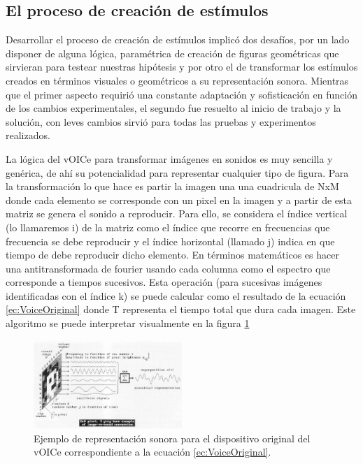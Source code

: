 \documentclass{article}
\begin{document}
\subsection{El proceso de creación de estímulos}
    
    Desarrollar el proceso de creación de estímulos implicó dos desafíos, por un lado disponer de alguna lógica, paramétrica de creación de figuras geométricas que sirvieran para testear nuestras hipótesis y por otro el de transformar los estímulos creados en términos visuales o geométricos a su representación sonora. Mientras que el primer aspecto requirió una constante adaptación y sofisticación en función de los cambios experimentales, el segundo fue resuelto al inicio de trabajo y la solución, con leves cambios sirvió para todas las pruebas y experimentos realizados. 
    
    La lógica del vOICe para transformar imágenes en sonidos es muy sencilla y genérica, de ahí su potencialidad para representar cualquier tipo de figura. Para la transformación lo que hace es partir la imagen una una cuadricula de NxM donde cada elemento se corresponde con un pixel en la imagen y a partir de esta matriz se genera el sonido a reproducir. Para ello, se considera el índice vertical (lo llamaremos i) de la matriz como el índice que recorre en frecuencias que frecuencia se debe reproducir y el índice horizontal (llamado j) indica en que tiempo de debe reproducir dicho elemento. En términos matemáticos es hacer una antitransformada de fourier usando cada columna como el espectro que corresponde a tiempos sucesivos. Esta operación (para sucesivas imágenes identificadas con el índice k) se puede calcular como el resultado de la ecuación \ref{ec:VoiceOriginal} donde T representa el tiempo total que dura cada imagen. Este algoritmo se puede interpretar visualmente en la figura \ref{fig:VoiceOriginal}
    
    \begin{figure}
        \center
        \includegraphics[width=0.5\textwidth]{Imagenes/VoiceOriginal.png}
        \caption{Ejemplo de representación sonora para el dispositivo original del vOICe \cite{Voice1} correspondiente a la ecuación \ref{ec:VoiceOriginal}.}
        \label{fig:VoiceOriginal}
    \end{figure}
    
\end{document}
